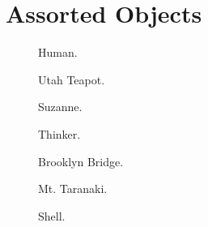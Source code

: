 \FloatBarrier
\section{Assorted Objects}

\begin{figure}[h!]
	\centering
	
	\caption{Human.}\label{render_human1}
\end{figure}

\begin{figure}[h!]
	\centering
	
	\caption{Utah Teapot.}\label{render_teapot}
\end{figure}

\begin{figure}[h!]
	\centering
	
	\caption{Suzanne.}\label{render_suzanne}
\end{figure}

\begin{figure}[h!]
	\centering
	
	\caption{Thinker.}\label{render_thinker}
\end{figure}

\begin{figure}[h!]
	\centering
	
	\caption{Brooklyn Bridge.}\label{render_brooklyn}
\end{figure}

\begin{figure}[h!]
	\centering
	
	\caption{Mt. Taranaki.}\label{render_taranaki}
\end{figure}

\begin{figure}[h!]
	\centering
	
	\caption{Shell.}\label{render_shell}
\end{figure}